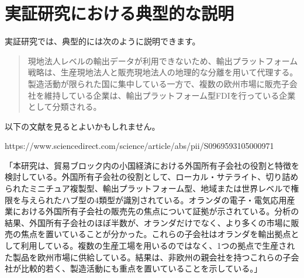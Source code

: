 \documentclass[11pt]{article}
\begin{document}
\section{実証研究における典型的な説明}

実証研究では、典型的には次のように説明できます。

\begin{quote}
現地法人レベルの輸出データが利用できないため、輸出プラットフォーム戦略は、生産現地法人と販売現地法人の地理的な分離を用いて代理する。製造活動が限られた国に集中している一方で、複数の欧州市場に販売子会社を維持している企業は、輸出プラットフォーム型FDIを行っている企業として分類される。
\end{quote}

以下の文献を見るとよいかもしれません。

https://www.sciencedirect.com/science/article/abs/pii/S0969593105000971

「本研究は、貿易ブロック内の小国経済における外国所有子会社の役割と特徴を検討している。外国所有子会社の役割として、ローカル・サテライト、切り詰められたミニチュア複製型、輸出プラットフォーム型、地域または世界レベルで権限を与えられたハブ型の4類型が識別されている。オランダの電子・電気応用産業における外国所有子会社の販売先の焦点について証拠が示されている。分析の結果、外国所有子会社のほぼ半数が、オランダだけでなく、より多くの市場に販売の焦点を置いていることが分かった。これらの子会社はオランダを輸出拠点として利用している。複数の生産工場を用いるのではなく、1つの拠点で生産された製品を欧州市場に供給している。結果は、非欧州の親会社を持つこれらの子会社が比較的若く、製造活動にも重点を置いていることを示している。」
\end{document}
